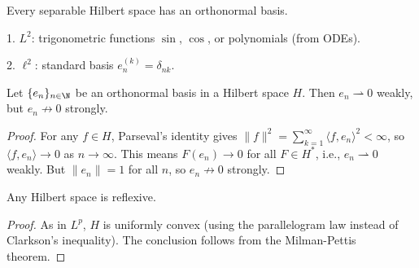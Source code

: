 \clearpage
\begin{theorem}
Every separable Hilbert space has an orthonormal basis.
\end{theorem}

\begin{example}
1. $L^2$: trigonometric functions $\sin$, $\cos$, or polynomials (from ODEs).

2. $\ell^2$: standard basis $e_n^{(k)} = \delta_{nk}$.
\end{example}

\begin{theorem}
Let $\{e_n\}_{n \in \N}$ be an orthonormal basis in a Hilbert space $H$. Then $e_n \rightharpoonup 0$ weakly, but $e_n \not\to 0$ strongly.
\end{theorem}

\begin{proof}
For any $f \in H$, Parseval's identity gives $\|f\|^2 = \sum_{k=1}^\infty \langle f, e_n \rangle^2 < \infty$, so $\langle f, e_n \rangle \to 0$ as $n \to \infty$. This means $F(e_n) \to 0$ for all $F \in H^*$, i.e., $e_n \rightharpoonup 0$ weakly. But $\|e_n\| = 1$ for all $n$, so $e_n \not\to 0$ strongly.
\end{proof}

\begin{theorem}
Any Hilbert space is reflexive.
\end{theorem}

\begin{proof}
As in $L^p$, $H$ is uniformly convex (using the parallelogram law instead of Clarkson's inequality). The conclusion follows from the Milman-Pettis theorem.
\end{proof}

